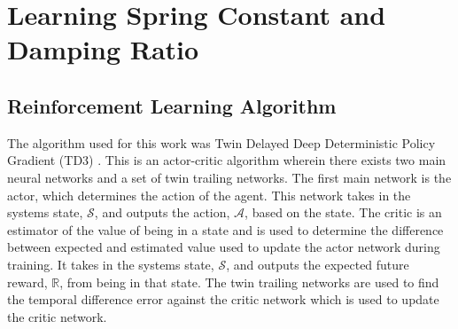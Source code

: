 \documentclass[letterpaper, 10 pt, conference]{ieeeconf}  %
\begin{document}
\section{Learning Spring Constant and Damping Ratio}
\label{sec:learning_mech_params}
\subsection{Reinforcement Learning Algorithm}
%
The algorithm used for this work was Twin Delayed Deep Deterministic Policy Gradient (TD3) \cite{Fujimoto2018d}. This is an actor-critic algorithm wherein there exists two main neural networks and a set of twin trailing networks. The first main network is the actor, which determines the action of the agent. This network takes in the systems state, $\mathcal{S}$, and outputs the action, $\mathcal{A}$, based on the state. The critic is an estimator of the value of being in a state and is used to determine the difference between expected and estimated value used to update the actor network during training. It takes in the systems state, $\mathcal{S}$, and outputs the expected future reward, $\mathbb{R}$, from being in that state. The twin trailing networks are used to find the temporal difference error against the critic network which is used to update the critic network.
\end{document}
